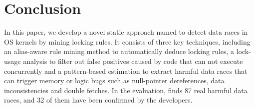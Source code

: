 \section{Conclusion}
\label{sec_conclusion}

In this paper, we develop a novel static approach named \sys to detect data 
races in OS kernels by mining locking rules. It consists of three key 
techniques, including an alias-aware rule mining method to automatically deduce 
locking rules, a lock-usage analysis to filter out false positives caused by 
code that can not execute concurrently and a pattern-based estimation to 
extract harmful data races that can trigger memory or logic bugs such as 
null-pointer dereferences, data inconsistencies and double fetches. In the 
evaluation, \sys finds 87 real harmful data races, and 32 of them have been 
confirmed by the developers.